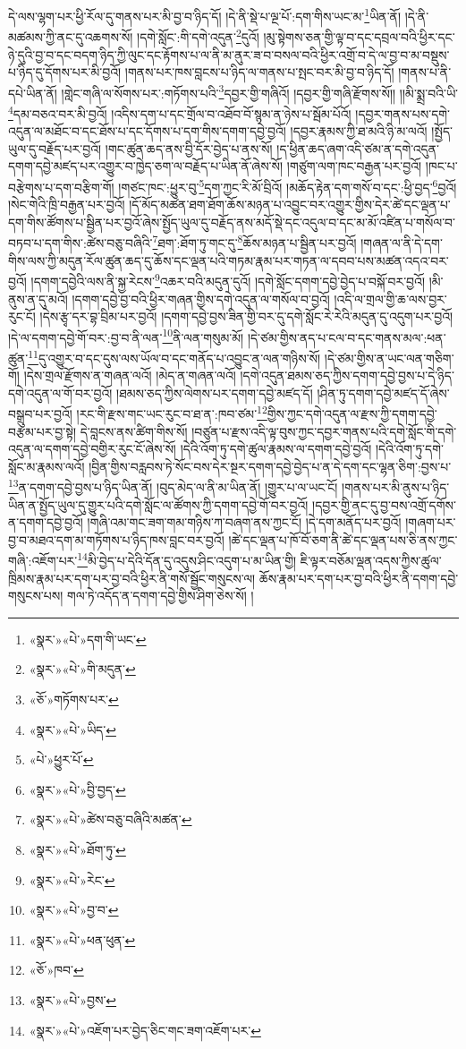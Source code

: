 དེ་ལས་ལྷག་པར་ཕྱི་རོལ་དུ་གནས་པར་མི་བྱ་བ་ཉིད་དོ། །དེ་ནི་སྡེ་པ་ལྔ་པོ་:དག་གིས་ཡང་མ་\footnote{«སྣར་»«པེ་»དག་གི་ཡང་}ཡིན་ནོ། །དེ་ནི་མཚམས་ཀྱི་ནང་དུ་འཆགས་སོ། །དགེ་སློང་:གི་དགེ་འདུན་\footnote{«སྣར་»«པེ་»གི་མདུན་}དུའོ། །མུ་སྟེགས་ཅན་གྱི་ལྟ་བ་དང་དབྲལ་བའི་ཕྱིར་དང་ཉེ་དུའི་བྱ་བ་དང་བདག་ཉིད་ཀྱི་ལུང་དང་རྟོགས་པ་ལ་ནི་མ་ནུར་ཟ་བ་བསལ་བའི་ཕྱིར་འགྲོ་བ་དེ་ལ་བྱ་བ་མ་བསྡུས་པ་ཉིད་དུ་དོགས་པར་མི་བྱའོ། །གནས་པར་ཁས་བླངས་པ་ཉིད་ལ་གནས་པ་སྤང་བར་མི་བྱ་བ་ཉིད་དོ། །གནས་པ་ནི་དཔེ་ཡིན་ནོ། །གླེང་གཞི་ལ་སོགས་པར་:གཏོགས་པའི་\footnote{«ཅོ་»གཏོགས་པར་}དབྱར་གྱི་གཞིའོ། །དབྱར་གྱི་གཞི་རྫོགས་སོ།། །།མི་སྨྲ་བའི་ཡི་\footnote{«སྣར་»«པེ་»ཡིད་}དམ་བཅའ་བར་མི་བྱའོ། །འདིས་དག་པ་དང་གྲོལ་བ་འཐོབ་བོ་སྙམ་ན་ཉེས་པ་སྦོམ་པོའོ། །དབྱར་གནས་པས་དགེ་འདུན་ལ་མཐོང་བ་དང་ཐོས་པ་དང་དོགས་པ་དག་གིས་དགག་དབྱེ་བྱའོ། །དབྱར་རྣམས་ཀྱི་ཐ་མའི་ཉི་མ་ལའོ། །སྤྱོད་ཡུལ་དུ་བརྗོད་པར་བྱའོ། །གང་ཚུན་ཆད་ནས་བྱི་དོར་བྱེད་པ་ནས་སོ། །ད་ཕྱིན་ཆད་ཞག་འདི་ཙམ་ན་དགེ་འདུན་དགག་དབྱེ་མཛད་པར་འགྱུར་བ་ཁྱེད་ཅག་ལ་བརྗོད་པ་ཡིན་ནོ་ཞེས་སོ། །གཙུག་ལག་ཁང་བརྒྱན་པར་བྱའོ། །ཁང་པ་བརྩེགས་པ་དག་བརྩིག་གོ། །གཙང་ཁང་:ཕྱུར་བུ་\footnote{«པེ་»ཕྱུར་པོ་}དག་ཀྱང་རི་མོ་བྲིའོ། །མཆོད་རྟེན་དག་གསོ་བ་དང་:ཕྱི་བྱད་\footnote{«སྣར་»«པེ་»བྱི་བྱད་}བྱའོ། །སེང་གེའི་ཁྲི་བརྒྱན་པར་བྱའོ། །དོ་མོད་མཚན་ཐག་ཐོག་ཆོས་མཉན་པ་འབྱུང་བར་འགྱུར་གྱིས་དེར་ཚེ་དང་ལྡན་པ་དག་གིས་ཚོགས་པ་སྦྱིན་པར་བྱའོ་ཞེས་སྤྱོད་ཡུལ་དུ་བརྗོད་ནས་མདོ་སྡེ་དང་འདུལ་བ་དང་མ་མོ་འཛིན་པ་གསོལ་བ་བཏབ་པ་དག་གིས་:ཚེས་བཅུ་བཞིའི་\footnote{«སྣར་»«པེ་»ཚེས་བཅུ་བཞིའི་མཚན་}ཐག་:ཐོག་ཏུ་གང་དུ་\footnote{«སྣར་»«པེ་»ཐོག་ཏུ་}ཆོས་མཉན་པ་སྦྱིན་པར་བྱའོ། །གཞན་ལ་ནི་དེ་དག་གིས་ལས་ཀྱི་མདུན་རོལ་ཚུན་ཆད་དུ་ཆོས་དང་ལྡན་པའི་གཏམ་རྣམ་པར་གཏན་ལ་དབབ་པས་མཚན་འདའ་བར་བྱའོ། །དགག་དབྱེའི་ལས་ནི་སྐྱ་རེངས་\footnote{«སྣར་»«པེ་»རེང་}འཆར་བའི་མདུན་དུའོ། །དགེ་སློང་དགག་དབྱེ་བྱེད་པ་བསྐོ་བར་བྱའོ། །མི་ནུས་ན་དུ་མའོ། །དགག་དབྱེ་བྱ་བའི་ཕྱིར་གཞན་གྱིས་དགེ་འདུན་ལ་གསོལ་བ་བྱའོ། །འདི་ལ་གྲལ་གྱི་ཆ་ལས་བྱར་རུང་ངོ། །དེས་རྩྭ་དར་བྷ་བྲིམ་པར་བྱའོ། །དགག་དབྱེ་བྱས་ཟིན་གྱི་བར་དུ་དགེ་སློང་རེ་རེའི་མདུན་དུ་འདུག་པར་བྱའོ། །དེ་ལ་དགག་དབྱེ་གོ་བར་:བྱ་བ་ནི་ལན་\footnote{«སྣར་»«པེ་»བྱ་བ་}ནི་ལན་གསུམ་མོ། །དེ་ཙམ་གྱིས་ནད་པ་ངལ་བ་དང་གནས་མལ་:ཕན་ཚུན་\footnote{«སྣར་»«པེ་»ཕན་ཕུན་}དུ་འགྱུར་བ་དང་དུས་ལས་ཡོལ་བ་དང་གནོད་པ་འབྱུང་ན་ལན་གཉིས་སོ། །དེ་ཙམ་གྱིས་ན་ཡང་ལན་གཅིག་གོ། །དེས་གྲལ་རྫོགས་ན་གཞན་ལའོ། །མེད་ན་གཞན་ལའོ། །དགེ་འདུན་ཐམས་ཅད་ཀྱིས་དགག་དབྱེ་བྱས་པ་དེ་ཉིད་དགེ་འདུན་ལ་གོ་བར་བྱའོ། །ཐམས་ཅད་ཀྱིས་ལེགས་པར་དགག་དབྱེ་མཛད་དོ། །ཤིན་ཏུ་དགག་དབྱེ་མཛད་དོ་ཞེས་བསྒྲུབ་པར་བྱའོ། །རང་གི་རྫས་གང་ཡང་རུང་བ་ཐ་ན་:ཁབ་ཙམ་\footnote{«ཅོ་»ཁབ་}གྱིས་ཀྱང་དགེ་འདུན་ལ་རྫས་ཀྱི་དགག་དབྱེ་བརྩམ་པར་བྱ་སྟེ། དེ་བླངས་ནས་ཚིག་གིས་སོ། །བཙུན་པ་རྫས་འདི་ལྟ་བུས་ཀྱང་དབྱར་གནས་པའི་དགེ་སློང་གི་དགེ་འདུན་ལ་དགག་དབྱེ་བགྱིར་རུང་ངོ་ཞེས་སོ། །དེའི་འོག་ཏུ་དགེ་ཚུལ་རྣམས་ལ་དགག་དབྱེ་བྱའོ། །དེའི་འོག་ཏུ་དགེ་སློང་མ་རྣམས་ལའོ། །བྱིན་གྱིས་བརླབས་ཏེ་སོང་བས་དེར་སྔར་དགག་དབྱེ་བྱེད་པ་ན་དེ་དག་དང་ལྷན་ཅིག་:བྱས་པ་\footnote{«སྣར་»«པེ་»བྱས་}ན་དགག་དབྱེ་བྱས་པ་ཉིད་ཡིན་ནོ། །བུད་མེད་ལ་ནི་མ་ཡིན་ནོ། །གྱུར་པ་ལ་ཡང་ངོ། །གནས་པར་མི་ནུས་པ་ཉིད་ཡིན་ན་སྤྱོད་ཡུལ་དུ་གྱུར་པའི་དགེ་སློང་ལ་ཚོགས་ཀྱི་དགག་དབྱེ་གོ་བར་བྱའོ། །དབྱར་གྱི་ནང་དུ་བྱ་བས་འགྲོ་དགོས་ན་དགག་དབྱེ་བྱའོ། །གཞི་འམ་གང་ཟག་གམ་གཉིས་ཀ་བཞག་ནས་ཀྱང་ངོ། །དེ་དག་མནོད་པར་བྱའོ། །གཞག་པར་བྱ་བ་མཐའ་དག་མ་གཏོགས་པ་ཉིད་ཁས་བླང་བར་བྱའོ། །ཚེ་དང་ལྡན་པ་ཁོ་བོ་ཅག་ནི་ཚེ་དང་ལྡན་པས་ཅི་ནས་ཀྱང་གཞི་:འཇོག་པར་\footnote{«སྣར་»«པེ་»འཇོག་པར་བྱེད་ཅིང་གང་ཟག་འཇོག་པར་}མི་བྱེད་པ་དེའི་དོན་དུ་འདུས་ཤིང་འདུག་པ་མ་ཡིན་གྱི། ཇི་ལྟར་བཅོམ་ལྡན་འདས་ཀྱིས་ཚུལ་ཁྲིམས་རྣམ་པར་དག་པར་བྱ་བའི་ཕྱིར་ནི་གསོ་སྦྱོང་གསུངས་ལ། ཆོས་རྣམ་པར་དག་པར་བྱ་བའི་ཕྱིར་ནི་དགག་དབྱེ་གསུངས་པས། གལ་ཏེ་འདོད་ན་དགག་དབྱེ་གྱིས་ཤིག་ཅེས་སོ། །
